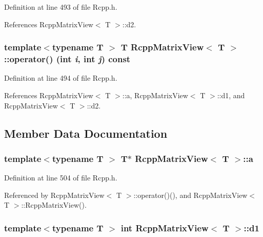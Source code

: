 Definition at line 493 of file Rcpp.h.

References RcppMatrixView$<$ T $>$::d2.\hypertarget{classRcppMatrixView_d135a7e855eee55b078807766aff9e96}{
\subsubsection[{operator()}]{\setlength{\rightskip}{0pt plus 5cm}template$<$typename T $>$ T {\bf RcppMatrixView}$<$ T $>$::operator() (int {\em i}, \/  int {\em j}) const}}
\label{classRcppMatrixView_d135a7e855eee55b078807766aff9e96}




Definition at line 494 of file Rcpp.h.

References RcppMatrixView$<$ T $>$::a, RcppMatrixView$<$ T $>$::d1, and RcppMatrixView$<$ T $>$::d2.

\subsection{Member Data Documentation}
\hypertarget{classRcppMatrixView_d38481118f63a84a132e8f2265de5bdd}{
\subsubsection[{a}]{\setlength{\rightskip}{0pt plus 5cm}template$<$typename T $>$ T$\ast$ {\bf RcppMatrixView}$<$ T $>$::{\bf a}}}
\label{classRcppMatrixView_d38481118f63a84a132e8f2265de5bdd}




Definition at line 504 of file Rcpp.h.

Referenced by RcppMatrixView$<$ T $>$::operator()(), and RcppMatrixView$<$ T $>$::RcppMatrixView().\hypertarget{classRcppMatrixView_d492401691ef709f6d2ef7dc1dcc2134}{
\subsubsection[{d1}]{\setlength{\rightskip}{0pt plus 5cm}template$<$typename T $>$ int {\bf RcppMatrixView}$<$ T $>$::{\bf d1}}}
\label{classRcppMatrixView_d492401691ef709f6d2ef7dc1dcc2134}




